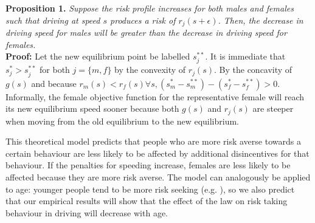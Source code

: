 
\textbf{Proposition 1.} {\it Suppose the risk profile increases 
for both males and females such that driving at speed $s$ 
produces a risk of $r_j (s+\epsilon)$. 
Then, the decrease in driving speed for males will be greater 
than the decrease in driving speed for females.} \\

\textbf{Proof:} Let the new equilibrium point be labelled $s_j^{**}$. 
It is immediate that $s_j^*>s_j^{**}$ 
for both $j=\{m,f\}$ by the convexity of $r_j (s)$. 
By the concavity of $g(s)$ 
and because 
$r_m (s)<r_f (s)  \forall s, 
(s_m^*-s_m^{**} ) - (s_f^*-s_f^{**})>0$. \\

Informally, the female objective function for the representative female 
will reach its new equilibrium speed sooner 
because both $g(s)$ and $r_j (s)$ are steeper 
when moving from the old equilibrium to the new equilibrium.

This theoretical model predicts that people who are more risk averse 
towards a certain behaviour are less likely to be affected 
by additional disincentives for that behaviour. 
If the penalties for speeding increase, 
females are less likely to be affected because they are more risk averse. 
The model can analogously be applied to age: 
younger people tend to be more risk seeking 
(e.g. \citet{gongyang2012}), 
so we also predict that our empirical results will show that the effect of the law 
on risk taking behaviour in driving will decrease with age.
